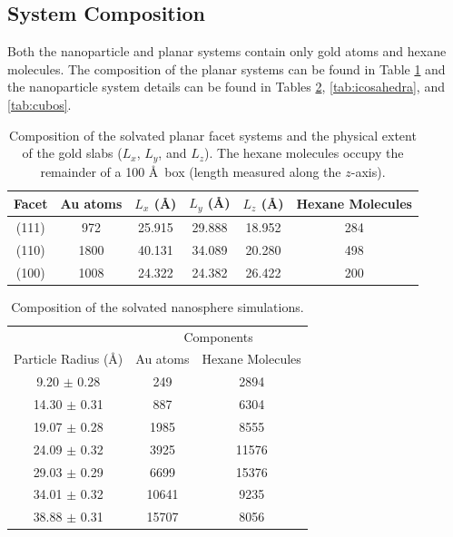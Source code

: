 \subsection{System Composition}
Both the nanoparticle and planar systems contain only gold atoms and
hexane molecules.  The composition of the planar systems can be found
in Table \ref{tab:facet} and the nanoparticle system details can be
found in Tables \ref{tab:spheres}, \ref{tab:icosahedra}, and \ref{tab:cubos}.

\begin{table}
\centering
\caption{Composition of the solvated planar facet systems and the
  physical extent of the gold slabs ($L_x$, $L_y$, and $L_z$). The
  hexane molecules occupy the remainder of a 100 \AA\ box (length
  measured along the $z$-axis).
  \label{tab:facet}}
\begin{tabular}{ c|cccc| c }
\toprule
Facet & Au atoms & $L_x$ (\AA) &$L_y$ (\AA) & $L_z$ (\AA) & Hexane Molecules\\
\midrule
(111) &  972 & 25.915   & 29.888 & 18.952 & 284      \\
(110) & 1800 & 40.131   & 34.089 & 20.280 & 498      \\
(100) & 1008 & 24.322   & 24.382 & 26.422 & 200      \\
\bottomrule
\end{tabular}
\end{table}

\begin{table}
\centering
\caption{Composition of the solvated nanosphere simulations.
  \label{tab:spheres}}
\begin{tabular}{ c|cc }
\toprule
        & \multicolumn{2}{c}{Components}\\
Particle Radius (\AA) & Au atoms & Hexane Molecules \\
\midrule
 9.20 $\pm$ 0.28  & 249   &  2894      \\
14.30 $\pm$ 0.31  & 887   &  6304      \\
19.07 $\pm$ 0.28  & 1985  &  8555      \\
24.09 $\pm$ 0.32  & 3925  & 11576      \\
29.03 $\pm$ 0.29  & 6699  & 15376      \\
34.01 $\pm$ 0.32  & 10641 &  9235      \\
38.88 $\pm$ 0.31  & 15707 &  8056      \\
\bottomrule
\end{tabular}
\end{table}

